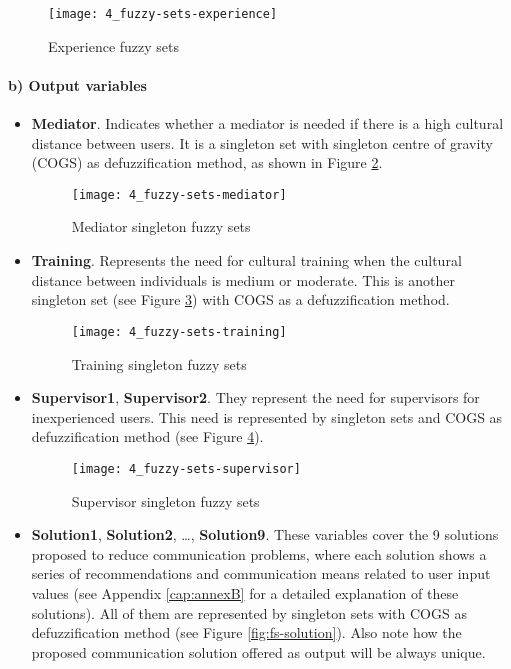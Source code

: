 	\begin{figure}
		\centering
		\texttt{[image: 4\_fuzzy-sets-experience]}
		\caption[Experience fuzzy sets]{Experience fuzzy sets}
		\label{fig:fs-exp}
	\end{figure}

\paragraph{b) Output variables}

\begin{itemize}
\item \textbf{Mediator}. Indicates whether a mediator is needed if there is a high cultural distance between users. It is a singleton set with singleton centre of gravity (COGS) as defuzzification method, as shown in Figure \ref{fig:fs-mediator}.

	\begin{figure}
		\centering
		\texttt{[image: 4\_fuzzy-sets-mediator]}
		\caption[Mediator singleton fuzzy sets]{Mediator singleton fuzzy sets}
		\label{fig:fs-mediator}
	\end{figure}

\item \textbf{Training}. Represents the need for cultural training when the cultural distance between individuals is medium or moderate. This is another singleton set (see Figure \ref{fig:fs-train}) with COGS as a defuzzification method.

	\begin{figure}
		\centering
		\texttt{[image: 4\_fuzzy-sets-training]}
		\caption[Training singleton fuzzy sets]{Training singleton fuzzy sets}
		\label{fig:fs-train}
	\end{figure}

\item \textbf{Supervisor1}, \textbf{Supervisor2}. They represent the need for supervisors for inexperienced users. This need is represented by singleton sets and COGS as defuzzification method (see Figure \ref{fig:fs-super}).

	\begin{figure}
		\centering
		\texttt{[image: 4\_fuzzy-sets-supervisor]}
		\caption[Supervisor singleton fuzzy sets]{Supervisor singleton fuzzy sets}
		\label{fig:fs-super}
	\end{figure}

\item \textbf{Solution1}, \textbf{Solution2}, …, \textbf{Solution9}. These variables cover the 9 solutions proposed to reduce communication problems, where each solution shows a series of recommendations and communication means related to user input values (see Appendix \ref{cap:annexB} for a detailed explanation of these solutions). All of them are represented by singleton sets with COGS as defuzzification method (see Figure \ref{fig:fs-solution}). Also note how the proposed communication solution offered as output will be always unique. 
\end{itemize}

